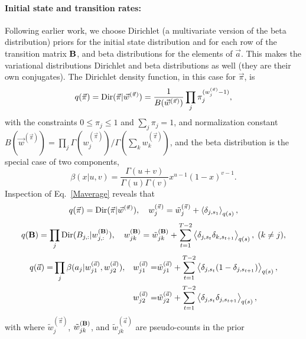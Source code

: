 \paragraph{Initial state and transition rates:}
Following earlier
work\cite{Mackay1997,Beal2003,Bronson2009,Okamoto2012,Persson2013}, we
choose Dirichlet (a multivariate version of the beta
distribution\cite{wiki:dirichlet}) priors for the initial state
distribution and for each row of the transition matrix $\mathbf{B}$,
and beta distributions for the elements of $\vec a$. This makes the
variational distributions Dirichlet and beta distributions as well
(they are their own conjugates). The Dirichlet density function, in
this case for $\vec\pi$, is
\begin{equation}\label{eq:p0pi}
        q(\vec\pi)=\text{Dir}(\vec\pi|\vec{w}^{(\vec{\pi})})=\frac{1}{B(\vec
        w^{(\vec\pi)})}\prod_j \pi_j^{(w_j^{(\vec\pi)}-1)},
\end{equation}
with the constraints $0\le \pi_j\le1$ and $\sum_j\pi_j=1$, and
normalization constant $B(\vec
w^{(\vec\pi)})=\prod_j\Gamma(w_j^{(\vec\pi)})/\Gamma(\sum_kw_k^{(\vec\pi)})$\cite{wiki:dirichlet},
and the beta distribution is the special case of two components,
\begin{equation}
\beta(x|u,v)=\frac{\Gamma(u+v)}{\Gamma(u)\Gamma(v)}x^{u-1}(1-x)^{v-1}.
\end{equation}
Inspection of Eq.~\eqref{Maverage} reveals that
\begin{equation}\label{VBM_pi}
  q(\vec{\pi})=\text{Dir}(\vec{\pi}|\vec{w}^{(\vec{\pi})}),\quad
w_j^{(\vec{\pi})}=\tilde
w_j^{(\vec{\pi})}+\left\langle \delta_{j,s_1}\right\rangle_{q(s)},
\end{equation}
\begin{equation}\label{VBM_B}
  q(\mathbf{B})=\prod_j
  \text{Dir}(B_{j,:}|w_{j,:}^{(\mathbf{B})}),\quad
w_{jk}^{(\mathbf{B})}=\tilde w_{jk}^{(\mathbf{B})}
  +\sum_{t=1}^{T-2}\left\langle \delta_{j,s_t}\delta_{k,s_{t+1}}\right\rangle_{q(s)},\; (k\ne j),
\end{equation}
\begin{align}
  q(\vec{a})=&\prod_j \beta(a_j|w_{j1}^{(\vec{a})},w_{j2}^{(\vec{a})}),&
  w_{j1}^{(\vec{a})}=&\tilde w_{j1}^{(\vec{a})}
  +\sum_{t=1}^{T-2}\left\langle \delta_{j,s_t}(1-\delta_{j,s_{t+1}})\right\rangle_{q(s)},\nonumber\\
  &&  
w_{j2}^{(\vec{a})}=&\tilde w_{j2}^{(\vec{a})}
  +\sum_{t=1}^{T-2}\left\langle \delta_{j,s_t}\delta_{j,s_{t+1}}\right\rangle_{q(s)},
\label{VBM_a}
\end{align}
with where $\tilde w_j^{(\vec{\pi})}$, $\tilde w_{jk}^{(\mathbf{B})}$,
and $\tilde w_{jk}^{(\vec{a})}$ are pseudo-counts in the prior
